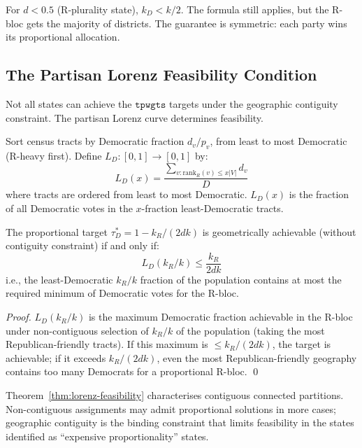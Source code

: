 \begin{remark}
For $d < 0.5$ (R-plurality state), $k_D < k/2$. The formula still applies,
but the R-bloc gets the majority of districts. The guarantee is symmetric:
each party wins its proportional allocation.
\end{remark}

\subsection{The Partisan Lorenz Feasibility Condition}

Not all states can achieve the $\mathtt{tpwgts}$ targets under the geographic
contiguity constraint. The partisan Lorenz curve determines feasibility.

\begin{definition}
\label{def:lorenz}
Sort census tracts by Democratic fraction $d_v / p_v$, from least to most
Democratic (R-heavy first). Define $L_D : [0,1] \to [0,1]$ by:
\[
  L_D(x) = \frac{\sum_{v : \mathrm{rank}_R(v) \leq x|V|} d_v}{D}
\]
where tracts are ordered from least to most Democratic.
$L_D(x)$ is the fraction of all Democratic votes in the $x$-fraction least-Democratic tracts.
\end{definition}

\begin{theorem}
\label{thm:lorenz-feasibility}
The proportional target $\tau_D^* = 1 - k_R/(2dk)$ is geometrically achievable
(without contiguity constraint) if and only if:
\[
  L_D(k_R/k) \leq \frac{k_R}{2dk}
\]
i.e., the least-Democratic $k_R/k$ fraction of the population contains at most
the required minimum of Democratic votes for the R-bloc.
\end{theorem}

\begin{proof}
$L_D(k_R/k)$ is the maximum Democratic fraction achievable in the R-bloc under
non-contiguous selection of $k_R/k$ of the population (taking the most
Republican-friendly tracts). If this maximum is $\leq k_R/(2dk)$, the target
is achievable; if it exceeds $k_R/(2dk)$, even the most Republican-friendly
geography contains too many Democrats for a proportional R-bloc. \qed
\end{proof}

\begin{remark}
Theorem~\ref{thm:lorenz-feasibility} characterises contiguous connected
partitions. Non-contiguous assignments may admit proportional solutions in more
cases; geographic contiguity is the binding constraint that limits feasibility
in the states identified as ``expensive proportionality'' states.
\end{remark}

